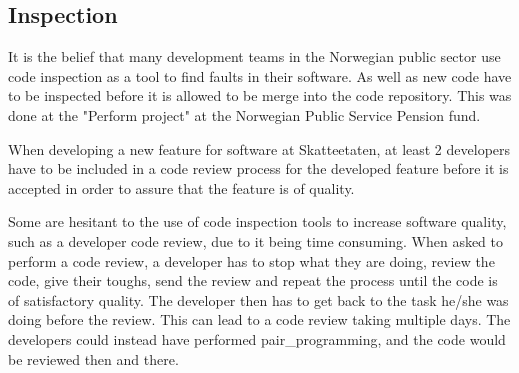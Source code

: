 



\subsection{Inspection}
It is the belief that many development teams in the Norwegian public sector use code inspection as a tool to find faults in their software. As well as new code have to be inspected before it is allowed to be merge into the code repository. This was done at the "Perform project" at the Norwegian Public Service Pension fund.

When developing a new feature for software at Skatteetaten, at least 2 developers have to be included in a code review process for the developed feature before it is accepted in order to assure that the feature is of quality.

Some are hesitant to the use of code inspection tools to increase software quality, such as a developer code review, due to it being time consuming. When asked to perform a code review, a developer has to stop what they are doing, review the code, give their toughs, send the review and repeat the process until the code is of satisfactory quality. The developer then has to get back to the task he/she was doing before the review. This can lead to a code review taking multiple days. The developers could instead have performed \gls{pair_programming}, and the code would be reviewed then and there. 

